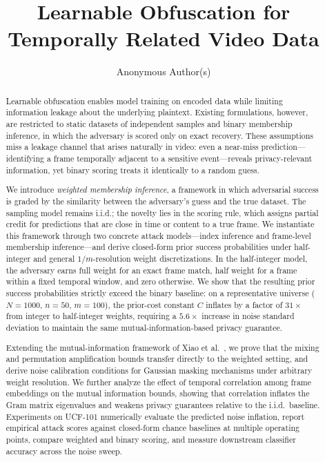 \documentclass[letterpaper]{article} %
\title{Learnable Obfuscation for Temporally Related Video Data}
\author{
    Anonymous Author(s)
}
\begin{document}
\maketitle

\begin{abstract}
Learnable obfuscation enables model training on encoded data while
limiting information leakage about the underlying plaintext.  Existing
formulations, however, are restricted to static datasets of
independent samples and binary membership inference, in which the
adversary is scored only on exact recovery.  These assumptions miss a
leakage channel that arises naturally in video: even a near-miss
prediction---identifying a frame temporally adjacent to a sensitive
event---reveals privacy-relevant information, yet binary scoring
treats it identically to a random guess.

We introduce \emph{weighted membership inference}, a framework in
which adversarial success is graded by the similarity between the
adversary's guess and the true dataset.  The sampling model remains
i.i.d.; the novelty lies in the scoring rule, which assigns partial
credit for predictions that are close in time or content to a true
frame.  We instantiate this framework through two concrete attack
models---index inference and frame-level membership inference---and
derive closed-form prior success probabilities under half-integer and
general $1/m$-resolution weight discretizations.  In the half-integer
model, the adversary earns full weight for an exact
frame match, half weight for a frame within a fixed temporal window,
and zero otherwise.  We show that the resulting prior success
probabilities strictly exceed the binary baseline: on a representative
universe ($N{=}1000$, $n{=}50$, $m{=}100$), the prior-cost constant
$C$ inflates by a factor of $31{\times}$ from integer to half-integer
weights, requiring a $5.6{\times}$ increase in noise standard
deviation to maintain the same mutual-information-based privacy
guarantee.

Extending the mutual-information framework of Xiao et
al.~\cite{xiao2024formal}, we prove that the mixing and permutation
amplification bounds transfer directly to the weighted setting, and
derive noise calibration conditions for Gaussian masking mechanisms
under arbitrary weight resolution.  We further analyze the effect of
temporal correlation among frame embeddings on the mutual information
bounds, showing that correlation inflates the Gram matrix eigenvalues
and weakens privacy guarantees relative to the i.i.d.\ baseline.
Experiments on UCF-101 numerically evaluate the predicted noise
inflation, report empirical attack scores against closed-form chance
baselines at multiple operating points, compare weighted and binary
scoring, and measure downstream classifier accuracy across the noise
sweep.
\end{abstract}
\end{document}
